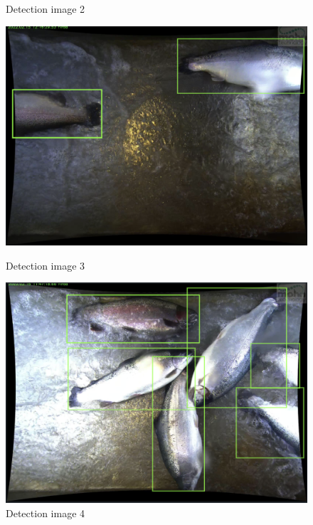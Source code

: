 \begin{figure}[H]
\begin{minipage}[b]{0.45\textwidth}
    \caption{Detection image 2}
    \label{fig:detection2}
  \end{minipage}
  \begin{minipage}[b]{0.45\textwidth}
    \centering
    \includegraphics[width=\textwidth]{Figures/detection3.png}
    \caption{Detection image 3}
    \label{fig:detection3}
  \end{minipage}
  \hfill
  \begin{minipage}[b]{0.45\textwidth}
    \centering
    \includegraphics[width=\textwidth]{Figures/detection4.png}
    \caption{Detection image 4}
    \label{fig:detection4}
  \end{minipage}
\end{figure}

